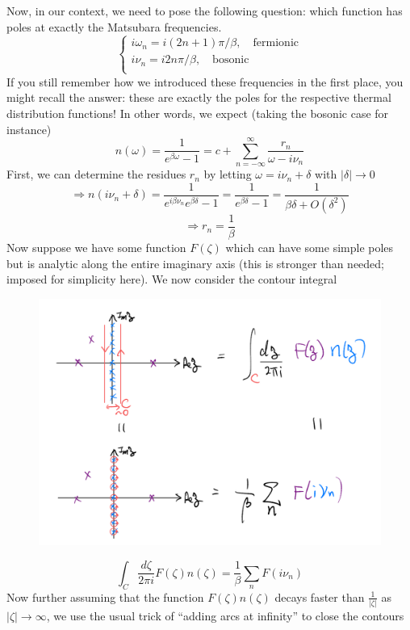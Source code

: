 Now, in our context, we need to pose the following question: which function has poles at exactly the Matsubara frequencies.
\[ \begin{cases}
   i\omega _n=i\left( 2n+1 \right) \pi /\beta ,\quad \mathrm{fermionic}\\
   i\nu _n=i2n\pi /\beta ,\quad \mathrm{bosonic}\\
\end{cases}\]
If you still remember how we introduced these frequencies in the first place, you might recall the answer: these are exactly the poles for the respective thermal distribution functions! In other words, we expect (taking the bosonic case for instance)
\[n\left( \omega \right) =\frac{1}{e^{\beta \omega}-1}=c+\sum_{n=-\infty}^{\infty}{\frac{r_n}{\omega -i\nu _n}}\]
First, we can determine the residues $r_n$ by letting $\omega =i\nu_n+\delta$ with $|\delta|\to 0$
\[ \Rightarrow n\left( i\nu _n+\delta \right) =\frac{1}{e^{i\beta \nu _n}e^{\beta \delta}-1}=\frac{1}{e^{\beta \delta}-1}=\frac{1}{\beta \delta +O\left( \delta ^2 \right)}\]
\[ \Rightarrow r_n=\frac{1}{\beta}\]
Now suppose we have some function $F(\zeta)$ which can have some simple poles but is analytic along the entire imaginary axis (this is stronger than needed; imposed for simplicity here). We now consider the contour integral
\begin{figure}[H]
    \centering
    \includegraphics[width=\textwidth]{jupyterbook/data/fig/lec24-fig00.png}
\end{figure}
\[ \int_C{\frac{d\zeta}{2\pi i}F\left( \zeta \right) n\left( \zeta \right)}=\frac{1}{\beta}\sum_n{F\left( i\nu _n \right)}\]
Now further assuming that the function $F(\zeta)n(\zeta)$ decays faster than $\frac{1}{|\zeta|}$ as $|\zeta|\to \infty$, we use the usual trick of ``adding arcs at infinity'' to close the contours
